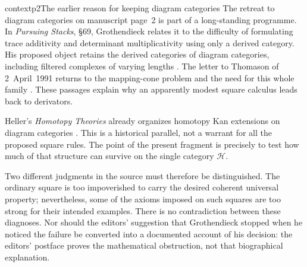 \begin{dcomment}{context}{p2}{The earlier reason for keeping diagram categories}
The retreat to diagram categories on manuscript page~2 is part of a long-standing programme. In \emph{Pursuing Stacks}, \S69, Grothendieck relates it to the difficulty of formulating trace additivity and determinant multiplicativity using only a derived category. His proposed object retains the derived categories of diagram categories, including filtered complexes of varying lengths \citep[pp.~1--2 of the edited excerpt]{Grothendieck1983}. The letter to Thomason of 2~April~1991 returns to the mapping-cone problem and the need for this whole family \citep[\S2, pp.~5--6]{Grothendieck1991Letter}. These passages explain why an apparently modest square calculus leads back to derivators.

Heller's \emph{Homotopy Theories} already organizes homotopy Kan extensions on diagram categories \citep[Introduction, pp.~1--2]{Heller1988}. This is a historical parallel, not a warrant for all the proposed square rules. The point of the present fragment is precisely to test how much of that structure can survive on the single category $\mathcal H$.

Two different judgments in the source must therefore be distinguished. The ordinary square is too impoverished to carry the desired coherent universal property; nevertheless, some of the axioms imposed on such squares are too strong for their intended examples. There is no contradiction between these diagnoses. Nor should the editors' suggestion that Grothendieck stopped when he noticed the failure be converted into a documented account of his decision: the editors' postface proves the mathematical obstruction, not that biographical explanation.
\end{dcomment}

